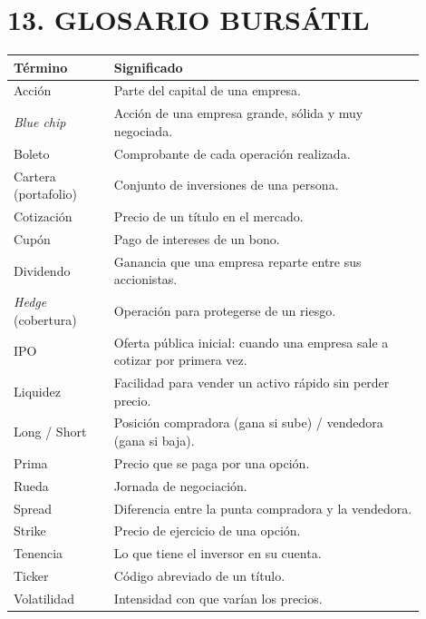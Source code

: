 \section*{13. GLOSARIO BURSÁTIL}
\begin{center}
\footnotesize
\begin{tabular}{|p{0.22\linewidth}|p{0.68\linewidth}|}
\hline
\textbf{Término} & \textbf{Significado} \\ \hline
Acción & Parte del capital de una empresa. \\ \hline
\textit{Blue chip} & Acción de una empresa grande, sólida y muy negociada. \\ \hline
Boleto & Comprobante de cada operación realizada. \\ \hline
Cartera (portafolio) & Conjunto de inversiones de una persona. \\ \hline
Cotización & Precio de un título en el mercado. \\ \hline
Cupón & Pago de intereses de un bono. \\ \hline
Dividendo & Ganancia que una empresa reparte entre sus accionistas. \\ \hline
\textit{Hedge} (cobertura) & Operación para protegerse de un riesgo. \\ \hline
IPO & Oferta pública inicial: cuando una empresa sale a cotizar por primera vez. \\ \hline
Liquidez & Facilidad para vender un activo rápido sin perder precio. \\ \hline
Long / Short & Posición compradora (gana si sube) / vendedora (gana si baja). \\ \hline
Prima & Precio que se paga por una opción. \\ \hline
Rueda & Jornada de negociación. \\ \hline
Spread & Diferencia entre la punta compradora y la vendedora. \\ \hline
Strike & Precio de ejercicio de una opción. \\ \hline
Tenencia & Lo que tiene el inversor en su cuenta. \\ \hline
Ticker & Código abreviado de un título. \\ \hline
Volatilidad & Intensidad con que varían los precios. \\ \hline
\end{tabular}
\end{center}

